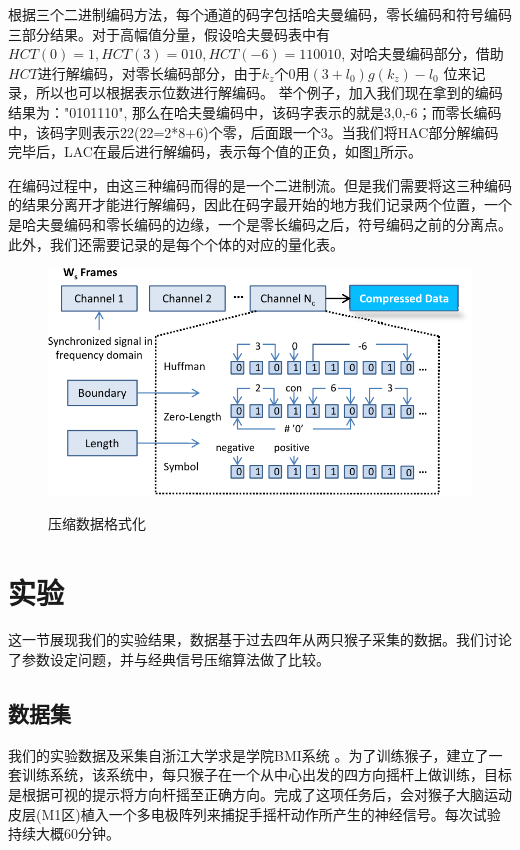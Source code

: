 根据三个二进制编码方法，每个通道的码字包括哈夫曼编码，零长编码和符号编码三部分结果。对于高幅值分量，假设哈夫曼码表中有$HCT(0)=1, HCT(3)=010, HCT(-6)=110010$, 对哈夫曼编码部分，借助$HCT$进行解编码，对零长编码部分，由于$k_z$个0用$(3+l_0)g(k_z)- l_0$ 位来记录，所以也可以根据表示位数进行解编码。 举个例子，加入我们现在拿到的编码结果为："0101110", 那么在哈夫曼编码中，该码字表示的就是3,0,-6；而零长编码中，该码字则表示22(22=2*8+6)个零，后面跟一个3。当我们将HAC部分解编码完毕后，LAC在最后进行解编码，表示每个值的正负，如图\ref{fig:Data Format}所示。

在编码过程中，由这三种编码而得的是一个二进制流。但是我们需要将这三种编码的结果分离开才能进行解编码，因此在码字最开始的地方我们记录两个位置，一个是哈夫曼编码和零长编码的边缘，一个是零长编码之后，符号编码之前的分离点。此外，我们还需要记录的是每个个体的对应的量化表。


\begin{figure}
  \centering
  \includegraphics{Pictures/Compression/f8-crop.pdf}\\
  \caption{压缩数据格式化}\label{fig:Data Format}
\end{figure}





\section{实验}\label{sec:experiment}
这一节展现我们的实验结果，数据基于过去四年从两只猴子采集的数据。我们讨论了参数设定问题，并与经典信号压缩算法做了比较。

\subsection{数据集}

我们的实验数据及采集自浙江大学求是学院BMI系统 \cite{14}。为了训练猴子，建立了一套训练系统，该系统中，每只猴子在一个从中心出发的四方向摇杆上做训练，目标是根据可视的提示将方向杆摇至正确方向。完成了这项任务后，会对猴子大脑运动皮层(M1区)植入一个多电极阵列来捕捉手摇杆动作所产生的神经信号。每次试验持续大概60分钟。

